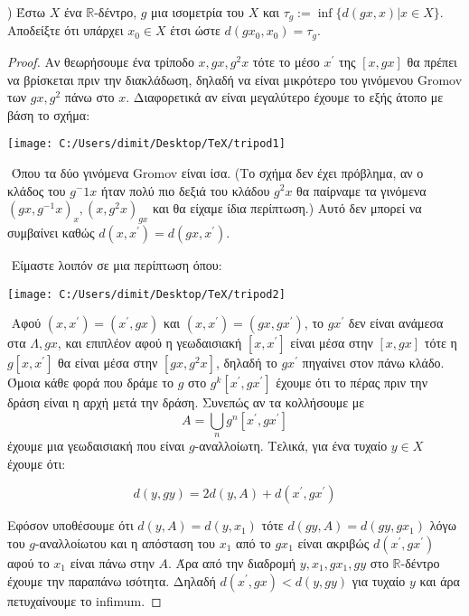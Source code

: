 \documentclass[oneside,a4paper]{article}
\newcommand {\tl}{\textlatin}
\begin{document}
\pagebreak
{}) Έστω $X$ ένα $\mathbb{R}$-δέντρο, $g$ μια ισομετρία του $X$ και $\tau_g := \inf\{d(gx,x)| x\in X\}$. Αποδείξτε ότι υπάρχει $x_0 \in X$ έτσι ώστε $d(gx_0,x_0) = \tau_g$.
\begin{proof}
	Αν θεωρήσουμε ένα τρίποδο $x,gx,g^2x$ τότε το μέσο $x^{\prime}$ της $[x,gx]$ θα πρέπει να βρίσκεται πριν την διακλάδωση, δηλαδή να είναι μικρότερο του γινόμενου \tl{Gromov} των $gx,g^2$ πάνω στο $x$. Διαφορετικά αν είναι μεγαλύτερο έχουμε το εξής άτοπο με βάση το σχήμα:
	\vspace*{1cm}
	\begin{center}
		\texttt{[image: C:/Users/dimit/Desktop/TeX/tripod1]}
		\end{center}
		

	$ $\newline
	Όπου τα δύο γινόμενα \tl{Gromov} είναι ίσα. (Το σχήμα δεν έχει πρόβλημα, αν ο κλάδος του $g^-1x $ ήταν πολύ πιο δεξιά του κλάδου $g^2x$ θα παίρναμε τα γινόμενα $(gx,g^{-1}x)_x, (x,g^2x)_{gx}$ και θα είχαμε ίδια περίπτωση.) Αυτό δεν μπορεί να συμβαίνει καθώς $d(x,x^{\prime}) = d(gx,x^{\prime})$.
	
	$ $\newline
	Είμαστε λοιπόν σε μια περίπτωση όπου:
	\vspace*{1cm}
	\begin{center}
		\texttt{[image: C:/Users/dimit/Desktop/TeX/tripod2]}
		\end{center}
	
	$ $\newline
	Αφού $(x,x^{\prime}) = (x^{\prime},gx)$ και $(x,x^{\prime}) = (gx,gx^{\prime})$, το $gx^{\prime}$ δεν είναι ανάμεσα στα $\Lambda, gx$, και επιπλέον αφού η γεωδαισιακή $[x,x^{\prime}]$ είναι μέσα στην $[x,gx]$ τότε η $g[x,x^{\prime}]$ θα είναι μέσα στην $[gx,g^2x]$, δηλαδή το $gx^{\prime}$ πηγαίνει στον πάνω κλάδο. Όμοια κάθε φορά που δράμε το $g$ στο $g^k[x^{\prime},gx^{\prime}]$ έχουμε ότι το πέρας πριν την δράση είναι η αρχή μετά την δράση. Συνεπώς αν τα κολλήσουμε με
	$$A = \bigcup\limits_n g^n [x^{\prime},gx^{\prime}]$$ έχουμε μια γεωδαισιακή που είναι $g$-αναλλοίωτη. Τελικά, για ένα τυχαίο $y \in X$ έχουμε ότι:

	$$d(y,gy) = 2d(y,A) + d(x^{\prime},gx^{\prime})$$ 
	
	
	Εφόσον υποθέσουμε ότι $d(y,A) = d(y,x_1)$ τότε $d(gy,A) = d(gy,gx_1)$ λόγω του $g$-αναλλοίωτου και η απόσταση του $x_1$ από το $gx_1$ είναι ακριβώς $d(x^{\prime},gx^{\prime})$ αφού το $x_1$ είναι πάνω στην $A$. Άρα από την διαδρομή $y,x_1,gx_1,gy$ στο $\mathbb{R}$-δέντρο έχουμε την παραπάνω ισότητα. Δηλαδή $d(x^{\prime},gx) < d(y,gy)$ για τυχαίο $y$ και άρα πετυχαίνουμε το \tl{infimum}.
	


\end{proof}
\end{document}
